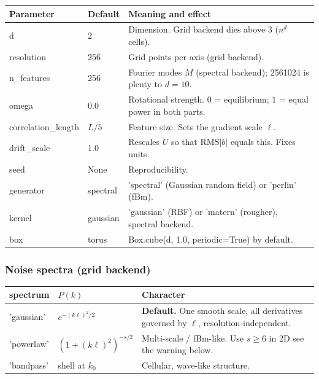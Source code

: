 \documentclass[11pt,a4paper]{article}
\newcommand{\code}[1]{{\ttfamily\small #1}}
\begin{document}
\begin{center}
\begin{tabular}{@{}L{0.22\textwidth} L{0.13\textwidth} L{0.57\textwidth}@{}}
\toprule
\textbf{Parameter} & \textbf{Default} & \textbf{Meaning and effect} \\
\midrule
\code{d}                  & 2       & Dimension. Grid backend dies above 3 ($n^d$ cells). \\
\code{resolution}         & 256     & Grid points per axis (grid backend). \\
\code{n\_features}        & 256     & Fourier modes $M$ (spectral backend); 256\textendash{}1024 is plenty to $d=10$. \\
\code{omega}              & 0.0     & Rotational strength. $0$ = equilibrium; $1$ = equal power in both parts. \\
\code{correlation\_length}& $L/5$   & Feature size. Sets the gradient scale $\ell$. \\
\code{drift\_scale}       & 1.0     & Rescales $U$ so that $\mathrm{RMS}|b|$ equals this. Fixes units. \\
\code{seed}               & None    & Reproducibility. \\
\code{generator}          & spectral& \code{'spectral'} (Gaussian random field) or \code{'perlin'} (fBm). \\
\code{kernel}             & gaussian& \code{'gaussian'} (RBF) or \code{'matern'} (rougher), spectral backend. \\
\code{box}                & torus   & \code{Box.cube(d, 1.0, periodic=True)} by default. \\
\bottomrule
\end{tabular}
\end{center}

\subsubsection*{Noise spectra (grid backend)}

\begin{center}
\begin{tabular}{@{}L{0.16\textwidth} L{0.30\textwidth} L{0.46\textwidth}@{}}
\toprule
\textbf{\code{spectrum}} & \textbf{$P(k)$} & \textbf{Character} \\
\midrule
\code{'gaussian'}  & $e^{-(k\ell)^2/2}$ & \textbf{Default.} One smooth scale, all derivatives governed by $\ell$, resolution-independent. \\
\code{'powerlaw'}  & $(1+(k\ell)^2)^{-s/2}$ & Multi-scale / fBm-like. Use $s\ge6$ in 2D \textemdash{} see the warning below. \\
\code{'bandpass'}  & shell at $k_0$ & Cellular, wave-like structure. \\
\bottomrule
\end{tabular}
\end{center}
\end{document}
